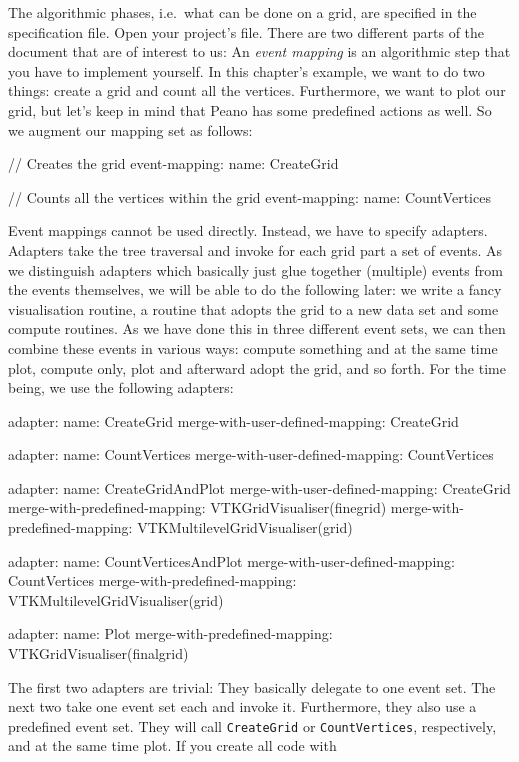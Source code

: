 The algorithmic phases, i.e.~what can be done on a grid, are specified in the
specification file.
Open your project's file. 
There are two different parts of the document that are of interest to us:
An {\em event mapping} is an algorithmic step that you have to implement
yourself.
In this chapter's example, we want to do two things: create a grid and count all
the vertices. 
Furthermore, we want to plot our grid, but let's keep in mind that Peano has
some predefined actions as well.
So we augment our mapping set as follows:

\begin{code}
// Creates the grid
event-mapping:
  name: CreateGrid

// Counts all the vertices within the grid
event-mapping:
  name: CountVertices
\end{code}

\noindent
Event mappings cannot be used directly.
Instead, we have to specify adapters. 
Adapters take the tree traversal and invoke for each grid part a set of events. 
As we distinguish adapters which basically just glue together (multiple) events
from the events themselves, we will be able to do the following later:
we write a fancy visualisation routine, a routine that adopts the grid to a new
data set and some compute routines.
As we have done this in three different event sets, we can then combine these
events in various ways: compute something and at the same time plot, compute
only, plot and afterward adopt the grid, and so forth.
For the time being, we use the following adapters:

\begin{code}
adapter:
  name: CreateGrid
  merge-with-user-defined-mapping: CreateGrid

adapter:
  name: CountVertices
  merge-with-user-defined-mapping: CountVertices

adapter:
  name: CreateGridAndPlot
  merge-with-user-defined-mapping: CreateGrid
  merge-with-predefined-mapping: VTKGridVisualiser(finegrid)
  merge-with-predefined-mapping: VTKMultilevelGridVisualiser(grid)

adapter:
  name: CountVerticesAndPlot
  merge-with-user-defined-mapping: CountVertices
  merge-with-predefined-mapping: VTKMultilevelGridVisualiser(grid)

adapter:
  name: Plot
  merge-with-predefined-mapping: VTKGridVisualiser(finalgrid)
\end{code}

The first two adapters are trivial: 
They basically delegate to one event set. 
The next two take one event set each and invoke it. 
Furthermore, they also use a predefined event set. 
They will call \texttt{CreateGrid} or \texttt{CountVertices}, respectively, and
at the same time plot.
If you create all code with 

